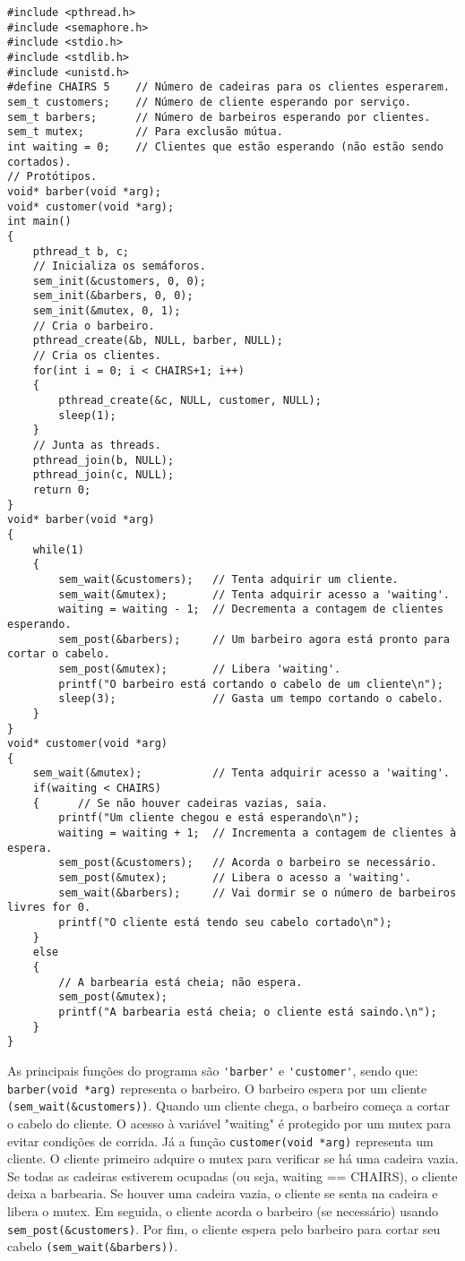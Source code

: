 \documentclass[10pt]{article}
\begin{document}
\begin{lstlisting}
#include <pthread.h>
#include <semaphore.h>
#include <stdio.h>
#include <stdlib.h>
#include <unistd.h>
#define CHAIRS 5    // Número de cadeiras para os clientes esperarem.
sem_t customers;    // Número de cliente esperando por serviço.
sem_t barbers;      // Número de barbeiros esperando por clientes.
sem_t mutex;        // Para exclusão mútua.
int waiting = 0;    // Clientes que estão esperando (não estão sendo cortados).
// Protótipos.
void* barber(void *arg);
void* customer(void *arg);
int main()
{
    pthread_t b, c;
    // Inicializa os semáforos.
    sem_init(&customers, 0, 0);
    sem_init(&barbers, 0, 0);
    sem_init(&mutex, 0, 1);
    // Cria o barbeiro.
    pthread_create(&b, NULL, barber, NULL);
    // Cria os clientes.
    for(int i = 0; i < CHAIRS+1; i++)
    {
        pthread_create(&c, NULL, customer, NULL);
        sleep(1);
    }
    // Junta as threads.
    pthread_join(b, NULL);
    pthread_join(c, NULL);
    return 0;
}
void* barber(void *arg)
{
    while(1)
    {
        sem_wait(&customers);   // Tenta adquirir um cliente.
        sem_wait(&mutex);       // Tenta adquirir acesso a 'waiting'.
        waiting = waiting - 1;  // Decrementa a contagem de clientes esperando.
        sem_post(&barbers);     // Um barbeiro agora está pronto para cortar o cabelo.
        sem_post(&mutex);       // Libera 'waiting'.
        printf("O barbeiro está cortando o cabelo de um cliente\n");
        sleep(3);               // Gasta um tempo cortando o cabelo.
    }
}
void* customer(void *arg)
{
    sem_wait(&mutex);           // Tenta adquirir acesso a 'waiting'.
    if(waiting < CHAIRS)
    {      // Se não houver cadeiras vazias, saia.
        printf("Um cliente chegou e está esperando\n");
        waiting = waiting + 1;  // Incrementa a contagem de clientes à espera.
        sem_post(&customers);   // Acorda o barbeiro se necessário.
        sem_post(&mutex);       // Libera o acesso a 'waiting'.
        sem_wait(&barbers);     // Vai dormir se o número de barbeiros livres for 0.
        printf("O cliente está tendo seu cabelo cortado\n");
    }
    else
    {
        // A barbearia está cheia; não espera.
        sem_post(&mutex);
        printf("A barbearia está cheia; o cliente está saindo.\n");
    }
}
\end{lstlisting}
As principais funções do programa são \verb|'barber'| e \verb|'customer'|, sendo que:
\verb|barber(void *arg)| representa o barbeiro. O barbeiro espera por um cliente \verb|(sem_wait(&customers))|.
Quando um cliente chega, o barbeiro começa a cortar o cabelo do cliente. O acesso à variável "waiting" é protegido
por um mutex para evitar condições de corrida.
Já a função \verb|customer(void *arg)| representa um cliente. O cliente primeiro adquire o mutex para verificar se há
uma cadeira vazia. Se todas as cadeiras estiverem ocupadas (ou seja, waiting == CHAIRS), o cliente deixa a barbearia. Se
houver uma cadeira vazia, o cliente se senta na cadeira e libera o mutex. Em seguida, o cliente acorda o barbeiro (se necessário)
usando \verb|sem_post(&customers)|. Por fim, o cliente espera pelo barbeiro para cortar seu cabelo \verb|(sem_wait(&barbers))|.
\end{document}
